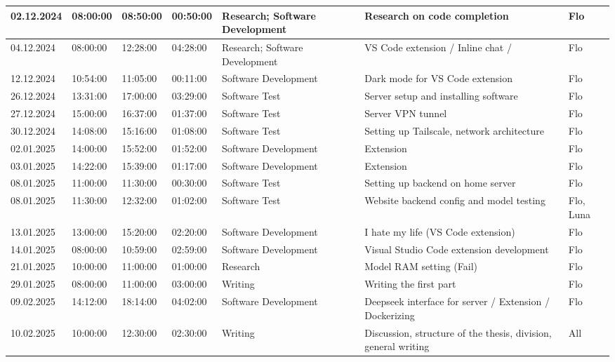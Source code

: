 \begin{longtable}{@{}p{1.3cm} p{1cm} p{1cm} p{1cm} p{1.5cm} p{4.5cm} p{1.2cm}@{}}
    \hline
    02.12.2024 & 08:00:00 & 08:50:00 & 00:50:00 & Research; Software Development & Research on code completion & Flo \\
    \hline
    04.12.2024 & 08:00:00 & 12:28:00 & 04:28:00 & Research; Software Development & VS Code extension / Inline chat / & Flo \\
    \hline
    12.12.2024 & 10:54:00 & 11:05:00 & 00:11:00 & Software Development & Dark mode for VS Code extension & Flo \\
    \hline
    26.12.2024 & 13:31:00 & 17:00:00 & 03:29:00 & Software Test & Server setup and installing software & Flo \\
    \hline
    27.12.2024 & 15:00:00 & 16:37:00 & 01:37:00 & Software Test & Server VPN tunnel & Flo \\
    \hline
    30.12.2024 & 14:08:00 & 15:16:00 & 01:08:00 & Software Test & Setting up Tailscale, network architecture & Flo \\
    \hline
    02.01.2025 & 14:00:00 & 15:52:00 & 01:52:00 & Software Development & Extension & Flo \\
    \hline
    03.01.2025 & 14:22:00 & 15:39:00 & 01:17:00 & Software Development & Extension & Flo \\
    \hline
    08.01.2025 & 11:00:00 & 11:30:00 & 00:30:00 & Software Test & Setting up backend on home server & Flo \\
    \hline
    08.01.2025 & 11:30:00 & 12:32:00 & 01:02:00 & Software Test & Website backend config and model testing & Flo, Luna \\
    \hline
    13.01.2025 & 13:00:00 & 15:20:00 & 02:20:00 & Software Development & I hate my life (VS Code extension) & Flo \\
    \hline
    14.01.2025 & 08:00:00 & 10:59:00 & 02:59:00 & Software Development & Visual Studio Code extension development & Flo \\
    \hline
    21.01.2025 & 10:00:00 & 11:00:00 & 01:00:00 & Research & Model RAM setting (Fail) & Flo \\
    \hline
    29.01.2025 & 08:00:00 & 11:00:00 & 03:00:00 & Writing & Writing the first part & Flo \\
    \hline
    09.02.2025 & 14:12:00 & 18:14:00 & 04:02:00 & Software Development & Deepseek interface for server / Extension / Dockerizing & Flo \\
    \hline
    10.02.2025 & 10:00:00 & 12:30:00 & 02:30:00 & Writing & Discussion, structure of the thesis, division, general writing & All \\

\end{longtable}
